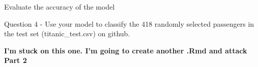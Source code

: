 \documentclass[
  ignorenonframetext,
]{beamer}
\newenvironment{Shaded}{\begin{snugshade}}{\end{snugshade}}
\newcommand{\CommentTok}[1]{\textcolor[rgb]{0.56,0.35,0.01}{\textit{#1}}}
\begin{document}
\begin{frame}[fragile]{Evaluate the accuracy of the model}
\begin{block}{Question 4 - Use your model to classify the 418 randomly
selected passengers in the test set (titanic\_test.csv) on github.}
\begin{Shaded}
\end{Shaded}

\textbf{I'm stuck on this one. I'm going to create another .Rmd and
attack Part 2}
\end{block}
\end{frame}
\end{document}
